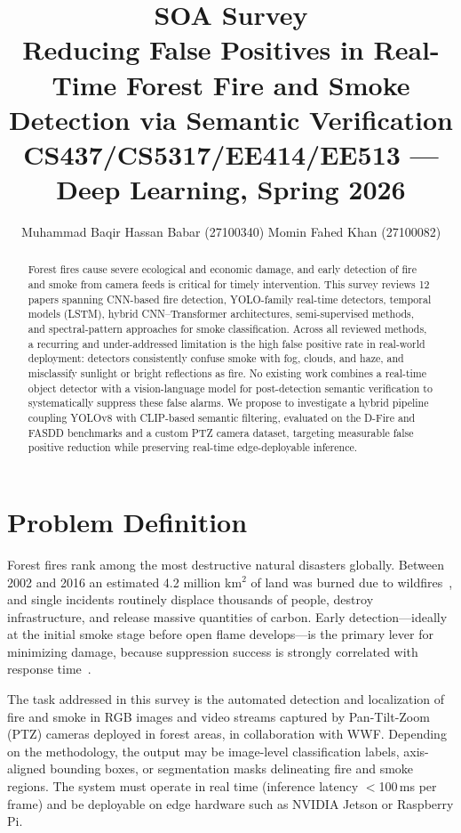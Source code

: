 \documentclass[11pt,twocolumn]{article}
\title{
    \vspace{-1cm}
    {\large \textbf{SOA Survey}} \\[0.3em]
    {\LARGE Reducing False Positives in Real-Time Forest Fire and Smoke Detection via Semantic Verification} \\[0.5em]
    {\normalsize CS437/CS5317/EE414/EE513 --- Deep Learning, Spring 2026}
}
\author{
    Muhammad Baqir Hassan Babar (27100340) \quad Momin Fahed Khan (27100082)
}
\date{}
\begin{document}
\maketitle
\thispagestyle{fancy}

\begin{abstract}
Forest fires cause severe ecological and economic damage, and early detection of fire and smoke from camera feeds is critical for timely intervention. This survey reviews 12 papers spanning CNN-based fire detection, YOLO-family real-time detectors, temporal models (LSTM), hybrid CNN--Transformer architectures, semi-supervised methods, and spectral-pattern approaches for smoke classification. Across all reviewed methods, a recurring and under-addressed limitation is the high false positive rate in real-world deployment: detectors consistently confuse smoke with fog, clouds, and haze, and misclassify sunlight or bright reflections as fire. No existing work combines a real-time object detector with a vision-language model for post-detection semantic verification to systematically suppress these false alarms. We propose to investigate a hybrid pipeline coupling YOLOv8 with CLIP-based semantic filtering, evaluated on the D-Fire and FASDD benchmarks and a custom PTZ camera dataset, targeting measurable false positive reduction while preserving real-time edge-deployable inference.
\end{abstract}

\section{Problem Definition}
\label{sec:problem}

Forest fires rank among the most destructive natural disasters globally. Between 2002 and 2016 an estimated 4.2 million km$^2$ of land was burned due to wildfires~\cite{detectron2fire}, and single incidents routinely displace thousands of people, destroy infrastructure, and release massive quantities of carbon. Early detection---ideally at the initial smoke stage before open flame develops---is the primary lever for minimizing damage, because suppression success is strongly correlated with response time~\cite{bilstm_smoke}.

The task addressed in this survey is the automated detection and localization of fire and smoke in RGB images and video streams captured by Pan-Tilt-Zoom (PTZ) cameras deployed in forest areas, in collaboration with WWF. Depending on the methodology, the output may be image-level classification labels, axis-aligned bounding boxes, or segmentation masks delineating fire and smoke regions. The system must operate in real time (inference latency $<$100\,ms per frame) and be deployable on edge hardware such as NVIDIA Jetson or Raspberry Pi.
\end{document}
